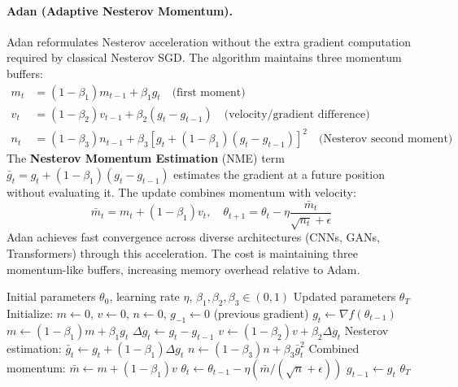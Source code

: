 \paragraph{Adan (Adaptive Nesterov Momentum).}
Adan reformulates Nesterov acceleration without the extra gradient computation required by classical Nesterov SGD. The algorithm maintains three momentum buffers:
\begin{align}
m_t &= (1-\beta_1)m_{t-1} + \beta_1 g_t \quad\text{(first moment)} \\
v_t &= (1-\beta_2)v_{t-1} + \beta_2(g_t - g_{t-1}) \quad\text{(velocity/gradient difference)} \\
n_t &= (1-\beta_3)n_{t-1} + \beta_3[g_t + (1-\beta_1)(g_t-g_{t-1})]^2 \quad\text{(Nesterov second moment)}
\end{align}
The \textbf{Nesterov Momentum Estimation} (NME) term $\bar{g}_t = g_t + (1-\beta_1)(g_t-g_{t-1})$ estimates the gradient at a future position without evaluating it. The update combines momentum with velocity:
\[\bar{m}_t = m_t + (1-\beta_1)v_t, \quad \theta_{t+1} = \theta_t - \eta\frac{\bar{m}_t}{\sqrt{n_t}+\epsilon}\]
Adan achieves fast convergence across diverse architectures (CNNs, GANs, Transformers) through this acceleration. The cost is maintaining three momentum-like buffers, increasing memory overhead relative to Adam.

\begin{algorithm}[H]
\caption{Adan (Adaptive Nesterov Momentum)}
\label{alg:adan}
\begin{algorithmic}[1]
\Require Initial parameters $\theta_0$, learning rate $\eta$, $\beta_1, \beta_2, \beta_3 \in (0,1)$
\Ensure Updated parameters $\theta_T$
\State Initialize: $m \gets 0$, $v \gets 0$, $n \gets 0$, $g_{-1} \gets 0$ (previous gradient)
    \State $g_t \gets \nabla f(\theta_{t-1})$
    \State $m \gets (1-\beta_1) m + \beta_1 g_t$
    \State $\Delta g_t \gets g_t - g_{t-1}$
    \State $v \gets (1-\beta_2) v + \beta_2 \Delta g_t$
    \State Nesterov estimation: $\bar{g}_t \gets g_t + (1-\beta_1) \Delta g_t$
    \State $n \gets (1-\beta_3) n + \beta_3 \bar{g}_t^2$
    \State Combined momentum: $\bar{m} \gets m + (1-\beta_1) v$
    \State $\theta_t \gets \theta_{t-1} - \eta (\bar{m} / (\sqrt{n} + \epsilon))$
    \State $g_{t-1} \gets g_t$
\EndFor
\Return $\theta_T$
\end{algorithmic}
\end{algorithm}

